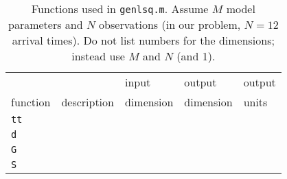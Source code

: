 \begin{table}[h]
\centering
\caption[]{{
Functions used in {\tt genlsq.m}.
Assume $M$ model parameters and $N$ observations (in our problem, $N=12$ arrival times). Do not list numbers for the dimensions; instead use $M$ and $N$ (and 1).
\label{tab:funs}
}}
\begin{spacing}{3}
\begin{tabular}{l|l|l|l|l}
\hline
         &                          & input     & output    & output \\
function & description \hspace{4cm} & dimension & dimension & units \hspace{0.5cm} \\
\hline\hline 
\verb+tt+ & & & & \\ \hline
\verb+d+  & & & & \\ \hline
\verb+G+  & & & & \\ \hline
\verb+S+  & & & & \\ \hline
\end{tabular}
\end{spacing}
\end{table}

